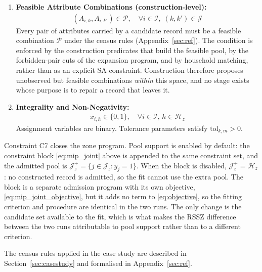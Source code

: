 \begin{enumerate}[label=\textbf{C\arabic*}, ref=C\arabic*]
    \item \textbf{Feasible Attribute Combinations (construction-level):}
    \begin{align}
        (A_{i,k}, A_{i,k'}) \in \mathcal{P}, \quad \forall i \in \mathcal{I}, \; (k, k') \in \mathcal{J}
        \label{eq:jatt}
    \end{align}
    Every pair of attributes carried by a candidate record must be a feasible combination \( \mathcal{P} \) under the census rules (Appendix~\ref{sec:ref}). The condition is enforced by the construction predicates that build the feasible pool, by the forbidden-pair cuts of the expansion program, and by household matching, rather than as an explicit SA constraint. Construction therefore proposes unobserved but feasible combinations \emph{within} this space, and no stage exists whose purpose is to repair a record that leaves it.

    \item \textbf{Integrality and Non-Negativity:}
    \begin{align}
        x_{i,h} \in \{0,1\}, \quad \forall i \in \mathcal{I}, \, h \in \mathcal{H}_z
        \label{eq:integrality}
    \end{align}
    Assignment variables are binary. Tolerance parameters satisfy \( \text{tol}_{k,m} > 0 \).

\end{enumerate}

Constraint C7 closes the zone program. Pool support is enabled by default: the constraint block \eqref{eq:mip_joint} above is appended to the same constraint set, and the admitted pool is \(\mathcal{J}_z^{+}=\{j\in\mathcal{J}_z:y_j=1\}\). When the block is disabled, \(\mathcal{J}_z^{+}=\mathcal{H}_z\): no constructed record is admitted, so the fit cannot use the extra pool. The block is a separate admission program with its own objective, \eqref{eq:mip_joint_objective}, but it adds no term to \eqref{eq:objective}, so the fitting criterion and procedure are identical in the two runs. The only change is the candidate set available to the fit, which is what makes the RSSZ difference between the two runs attributable to pool support rather than to a different criterion.

The census rules applied in the case study are described in Section~\ref{sec:casestudy} and formalised in Appendix~\ref{sec:ref}.

